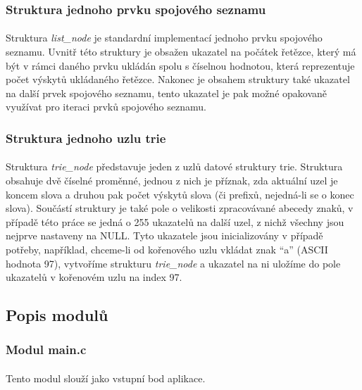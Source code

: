﻿\documentclass[12pt, a4paper]{article}
\begin{document}
\subsubsection{Struktura jednoho prvku spojového seznamu}
\paragraph{}
Struktura \textit{list\_node} je standardní implementací jednoho prvku spojového seznamu. Uvnitř této struktury je obsažen ukazatel na počátek řetězce, který má být v rámci daného prvku ukládán spolu s číselnou hodnotou, která reprezentuje počet výskytů ukládaného řetězce. Nakonec je obsahem struktury také ukazatel na další prvek spojového seznamu, tento ukazatel je pak možné opakovaně využívat pro iteraci prvků spojového seznamu.

\subsubsection{Struktura jednoho uzlu trie}
\paragraph{}
Struktura \textit{trie\_node} představuje jeden z uzlů datové struktury trie. Struktura obsahuje dvě číselné proměnné, jednou z nich je příznak, zda aktuální uzel je koncem slova a druhou pak počet výskytů slova (či prefixů, nejedná-li se o konec slova). Součástí struktury je také pole o velikosti zpracovávané abecedy znaků, v případě této práce se jedná o 255 ukazatelů na další uzel, z nichž všechny jsou nejprve nastaveny na NULL. Tyto ukazatele jsou inicializovány v případě potřeby, například, chceme-li od kořenového uzlu vkládat znak "`a"' (ASCII hodnota 97), vytvoříme strukturu \textit{trie\_node} a ukazatel na ni uložíme do pole ukazatelů v kořenovém uzlu na index 97.


\subsection{Popis modulů}
\subsubsection{Modul main.c}
\paragraph{}
Tento modul slouží jako vstupní bod aplikace. 
\end{document}
